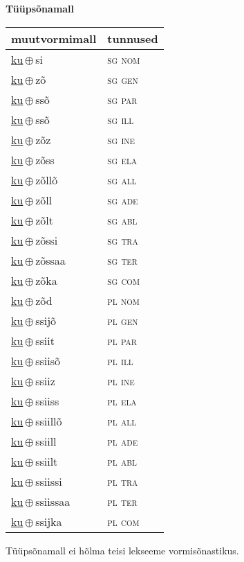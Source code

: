 

\vspace{3.5em}
\noindent \begin{minipage}{\textwidth}
\noindent \textbf{Tüüpsõnamall \,}\\

\begin{sideways}
\begin{tabular}{l l}
muutvormimall & tunnused \\
\hline
\underline{ku}\,$\oplus$\,si & \textsc{ sg nom } \\
\underline{ku}\,$\oplus$\,zõ & \textsc{ sg gen } \\
\underline{ku}\,$\oplus$\,ssõ & \textsc{ sg par } \\
\underline{ku}\,$\oplus$\,ssõ & \textsc{ sg ill } \\
\underline{ku}\,$\oplus$\,zõz & \textsc{ sg ine } \\
\underline{ku}\,$\oplus$\,zõss & \textsc{ sg ela } \\
\underline{ku}\,$\oplus$\,zõllõ & \textsc{ sg all } \\
\underline{ku}\,$\oplus$\,zõll & \textsc{ sg ade } \\
\underline{ku}\,$\oplus$\,zõlt & \textsc{ sg abl } \\
\underline{ku}\,$\oplus$\,zõssi & \textsc{ sg tra } \\
\underline{ku}\,$\oplus$\,zõssaa & \textsc{ sg ter } \\
\underline{ku}\,$\oplus$\,zõka & \textsc{ sg com } \\
\underline{ku}\,$\oplus$\,zõd & \textsc{ pl nom } \\
\underline{ku}\,$\oplus$\,ssijõ & \textsc{ pl gen } \\
\underline{ku}\,$\oplus$\,ssiit & \textsc{ pl par } \\
\underline{ku}\,$\oplus$\,ssiisõ & \textsc{ pl ill } \\
\underline{ku}\,$\oplus$\,ssiiz & \textsc{ pl ine } \\
\underline{ku}\,$\oplus$\,ssiiss & \textsc{ pl ela } \\
\underline{ku}\,$\oplus$\,ssiillõ & \textsc{ pl all } \\
\underline{ku}\,$\oplus$\,ssiill & \textsc{ pl ade } \\
\underline{ku}\,$\oplus$\,ssiilt & \textsc{ pl abl } \\
\underline{ku}\,$\oplus$\,ssiissi & \textsc{ pl tra } \\
\underline{ku}\,$\oplus$\,ssiissaa & \textsc{ pl ter } \\
\underline{ku}\,$\oplus$\,ssijka & \textsc{ pl com } \\
\end{tabular}
\end{sideways}
\label{tab:tüüpsõnamall-kusi}

\end{minipage}

 
\vspace{1em}
\noindent Tüüpsõnamall  ei hõlma teisi lekseeme vormi\-sõnastikus.
